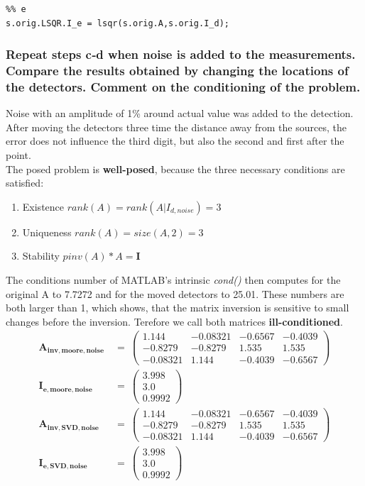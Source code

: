 \begin{lstlisting}
%% e
s.orig.LSQR.I_e = lsqr(s.orig.A,s.orig.I_d);
\end{lstlisting}



\clearpage
\subsubsection{Repeat steps c‐d when noise is added to the measurements. Compare the results
obtained by changing the locations of the detectors. Comment on the conditioning of
the problem.}
Noise with an amplitude of 1\% around actual value was added to the detection.\\
After moving the detectors three time the distance away from the sources, the error does not influence the third digit, but also the second and first after the point.\\
The posed problem is \textbf{well-posed}, because the three necessary conditions are satisfied:
\begin{enumerate}
    \item Existence $rank(A) = rank(A|I_{d,noise}) = 3$
    \item Uniqueness $rank(A) = size(A,2) = 3$
    \item Stability $pinv(A)*A = \mathbf{I}$
\end{enumerate}
 The conditions number of MATLAB's intrinsic \textit{cond()} then computes for the original A to \num{7.7272} and for the moved detectors to \num{25.01}. These numbers are both larger than 1, which shows, that the matrix inversion is sensitive to small changes before the inversion. Terefore we call both matrices \textbf{ill-conditioned}.
\begin{align}
\mathbf{A_{inv,moore,noise}}\ &=\ \left(\begin{array}{cccc} 1.144 & -0.08321 & -0.6567 & -0.4039\\ -0.8279 & -0.8279 & 1.535 & 1.535\\ -0.08321 & 1.144 & -0.4039 & -0.6567 \end{array}\right)\\
\mathbf{I_{e,moore,noise}}\ &=\ \left(\begin{array}{c} 3.998\\ 3.0\\ 0.9992 \end{array}\right)\\
\mathbf{A_{inv,SVD,noise}}\ &=\ \left(\begin{array}{cccc} 1.144 & -0.08321 & -0.6567 & -0.4039\\ -0.8279 & -0.8279 & 1.535 & 1.535\\ -0.08321 & 1.144 & -0.4039 & -0.6567 \end{array}\right)\\
\mathbf{I_{e,SVD,noise}}\ &=\ \left(\begin{array}{c} 3.998\\ 3.0\\ 0.9992 \end{array}\right)
\end{align}

